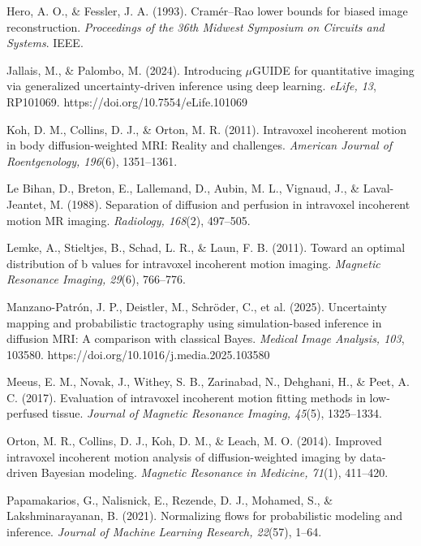 \documentclass[11pt]{article}
\begin{document}
\begin{list}{}{\setlength{\leftmargin}{1.5em}\setlength{\itemindent}{-1.5em}\setlength{\itemsep}{3pt}}
\item Hero, A. O., \& Fessler, J. A. (1993). Cram\'er--Rao lower bounds for biased image
reconstruction. \textit{Proceedings of the 36th Midwest Symposium on Circuits and
Systems}. IEEE.

\item Jallais, M., \& Palombo, M. (2024). Introducing $\mu$GUIDE for quantitative imaging
via generalized uncertainty-driven inference using deep learning. \textit{eLife, 13},
RP101069. https://doi.org/10.7554/eLife.101069

\item Koh, D. M., Collins, D. J., \& Orton, M. R. (2011). Intravoxel incoherent motion in
body diffusion-weighted MRI: Reality and challenges. \textit{American Journal of
Roentgenology, 196}(6), 1351--1361.

\item Le Bihan, D., Breton, E., Lallemand, D., Aubin, M. L., Vignaud, J., \&
Laval-Jeantet, M. (1988). Separation of diffusion and perfusion in intravoxel incoherent
motion MR imaging. \textit{Radiology, 168}(2), 497--505.

\item Lemke, A., Stieltjes, B., Schad, L. R., \& Laun, F. B. (2011). Toward an optimal
distribution of b values for intravoxel incoherent motion imaging. \textit{Magnetic
Resonance Imaging, 29}(6), 766--776.

\item Manzano-Patr\'on, J. P., Deistler, M., Schr\"oder, C., et al. (2025). Uncertainty
mapping and probabilistic tractography using simulation-based inference in diffusion MRI:
A comparison with classical Bayes. \textit{Medical Image Analysis, 103}, 103580.
https://doi.org/10.1016/j.media.2025.103580

\item Meeus, E. M., Novak, J., Withey, S. B., Zarinabad, N., Dehghani, H., \& Peet, A. C.
(2017). Evaluation of intravoxel incoherent motion fitting methods in low-perfused tissue.
\textit{Journal of Magnetic Resonance Imaging, 45}(5), 1325--1334.

\item Orton, M. R., Collins, D. J., Koh, D. M., \& Leach, M. O. (2014). Improved
intravoxel incoherent motion analysis of diffusion-weighted imaging by data-driven
Bayesian modeling. \textit{Magnetic Resonance in Medicine, 71}(1), 411--420.

\item Papamakarios, G., Nalisnick, E., Rezende, D. J., Mohamed, S., \&
Lakshminarayanan, B. (2021). Normalizing flows for probabilistic modeling and inference.
\textit{Journal of Machine Learning Research, 22}(57), 1--64.


\end{list}
\end{document}
